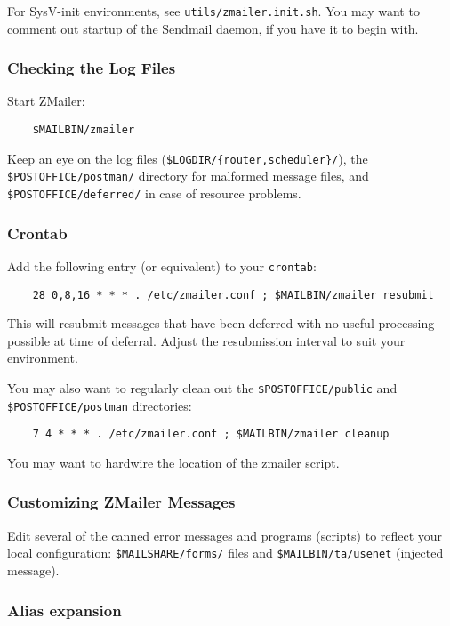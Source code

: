 For SysV-init environments, see {\tt utils/zmailer.init.sh}.
You may want to comment out startup of the Sendmail daemon, if you have it to begin with.


\subsubsection{Checking the Log Files}

Start ZMailer:
\begin{verbatim}
    $MAILBIN/zmailer
\end{verbatim}

Keep an eye on the log files ({\tt \$LOGDIR/\{router,scheduler\}/}),
the {\tt \$POSTOFFICE/postman/} directory for malformed message files,
and {\tt \$POSTOFFICE/deferred/} in case of resource problems.


\subsubsection{Crontab}

Add the following entry (or equivalent) to your {\tt crontab}:
\begin{verbatim}
    28 0,8,16 * * * . /etc/zmailer.conf ; $MAILBIN/zmailer resubmit
\end{verbatim}

This will resubmit messages that have been deferred with no
useful processing possible at time of deferral.  Adjust the
resubmission interval to suit your environment.

You may also want to regularly clean out the {\tt \$POSTOFFICE/public}
and {\tt \$POSTOFFICE/postman} directories:
\begin{verbatim}
    7 4 * * * . /etc/zmailer.conf ; $MAILBIN/zmailer cleanup
\end{verbatim}

You may want to hardwire the location of the zmailer script.


\subsubsection{Customizing ZMailer Messages}

Edit several of the canned error messages and programs (scripts)
to reflect your local configuration: {\tt \$MAILSHARE/forms/} files and
{\tt \$MAILBIN/ta/usenet} (injected message).


\subsubsection{Alias expansion}

